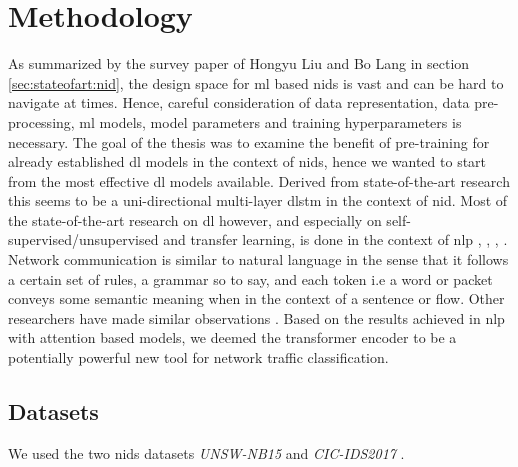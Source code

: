 \chapter{Methodology} \label{sec:methodology}

As summarized by the survey paper \cite{nid_ml_survey_2019} of Hongyu Liu and Bo Lang in section \ref{sec:stateofart:nid}, the design space for \gls{ml} based \gls{nids} is vast and can be hard to navigate at times. Hence, careful consideration of data representation, data pre-processing, \gls{ml} models, model parameters and training hyperparameters is necessary. The goal of the thesis was to examine the benefit of pre-training for already established \gls{dl} models in the context of \gls{nids}, hence we wanted to start from the most effective \gls{dl} models available. Derived from state-of-the-art research this seems to be a uni-directional multi-layer \gls{dlstm} in the context of \gls{nid}. Most of the state-of-the-art research on \gls{dl} however, and especially on self-supervised/unsupervised and transfer learning, is done in the context of \gls{nlp} \cite{bert}, \cite{elmo}, \cite{attention}, \cite{gpt3}. Network communication is similar to natural language in the sense that it follows a certain set of rules, a grammar so to say, and each token i.e a word or packet conveys some semantic meaning when in the context of a sentence or flow. Other researchers have made similar observations \cite{anomaly_detection_recurrent_neural_networks}. Based on the results achieved in \gls{nlp} with attention based models, we deemed the transformer encoder to be a potentially powerful new tool for network traffic classification. 

\section{Datasets} \label{sec:methodology:datasets}

We used the two \gls{nids} datasets \textit{UNSW-NB15} \cite{unsw_nb15} and \textit{CIC-IDS2017} \cite{cic_ids_2017}. \par

